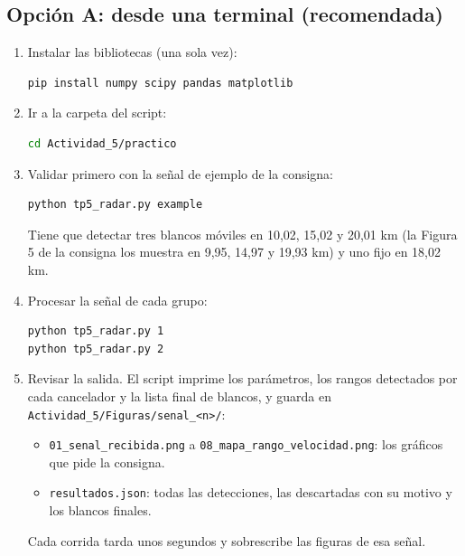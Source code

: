 \documentclass[11pt]{article}
\newcommand{\archivo}[1]{\texttt{#1}}
\begin{document}
\subsection{Opción A: desde una terminal (recomendada)}
\begin{enumerate}
  \item Instalar las bibliotecas (una sola vez):
\begin{lstlisting}[language=bash, numbers=none]
pip install numpy scipy pandas matplotlib
\end{lstlisting}
  \item Ir a la carpeta del script:
\begin{lstlisting}[language=bash, numbers=none]
cd Actividad_5/practico
\end{lstlisting}
  \item Validar primero con la señal de ejemplo de la consigna:
\begin{lstlisting}[language=bash, numbers=none]
python tp5_radar.py example
\end{lstlisting}
  Tiene que detectar tres blancos móviles en 10,02, 15,02 y 20,01 km (la Figura 5 de la consigna los muestra en 9,95, 14,97 y 19,93 km) y uno fijo en 18,02 km.
  \item Procesar la señal de cada grupo:
\begin{lstlisting}[language=bash, numbers=none]
python tp5_radar.py 1
python tp5_radar.py 2
\end{lstlisting}
  \item Revisar la salida. El script imprime los parámetros, los rangos detectados por cada cancelador y la lista final de blancos, y guarda en \archivo{Actividad\_5/Figuras/senal\_<n>/}:
  \begin{itemize}
    \item \archivo{01\_senal\_recibida.png} a \archivo{08\_mapa\_rango\_velocidad.png}: los gráficos que pide la consigna.
    \item \archivo{resultados.json}: todas las detecciones, las descartadas con su motivo y los blancos finales.
  \end{itemize}
  Cada corrida tarda unos segundos y sobrescribe las figuras de esa señal.
\end{enumerate}
\end{document}
